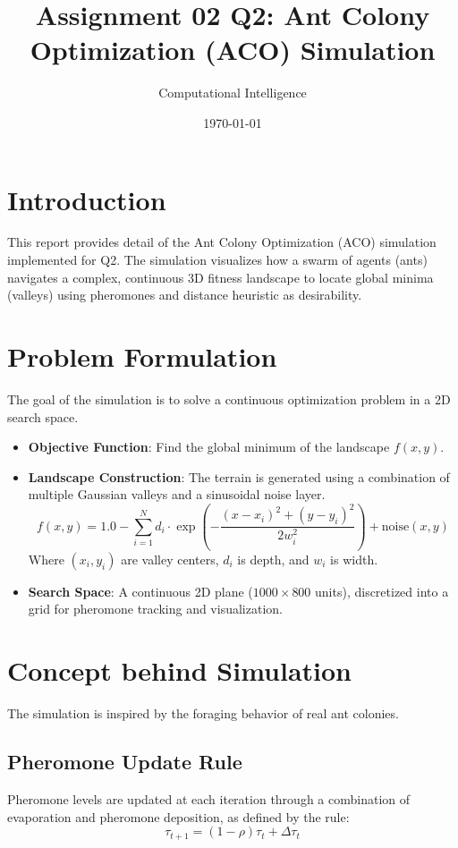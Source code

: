 \documentclass[12pt]{article}
\title{Assignment 02 Q2: Ant Colony Optimization (ACO) Simulation}
\author{Computational Intelligence}
\date{\today}
\begin{document}
\maketitle

\section{Introduction}
This report provides detail of the Ant Colony Optimization (ACO) simulation implemented for Q2. The simulation visualizes how a swarm of agents (ants) navigates a complex, continuous 3D fitness landscape to locate global minima (valleys) using pheromones and distance heuristic as desirability.

\section{Problem Formulation}
The goal of the simulation is to solve a continuous optimization problem in a 2D search space.

\begin{itemize}
    \item \textbf{Objective Function}: Find the global minimum of the landscape $f(x, y)$.
    \item \textbf{Landscape Construction}: The terrain is generated using a combination of multiple Gaussian valleys and a sinusoidal noise layer.
    \begin{equation}
        f(x, y) = 1.0 - \sum_{i=1}^{N} d_i \cdot \exp\left(-\frac{(x-x_i)^2 + (y-y_i)^2}{2w_i^2}\right) + \text{noise}(x, y)
    \end{equation}
    Where $(x_i, y_i)$ are valley centers, $d_i$ is depth, and $w_i$ is width.
    \item \textbf{Search Space}: A continuous 2D plane ($1000 \times 800$ units), discretized into a grid for pheromone tracking and visualization.
\end{itemize}

\section{Concept behind Simulation}
The simulation is inspired by the foraging behavior of real ant colonies.

\subsection{Pheromone Update Rule}
Pheromone levels are updated at each iteration through a combination of evaporation and pheromone deposition, as defined by the rule:
\begin{equation}
    \tau_{t+1} = (1 - \rho)\tau_t + \Delta \tau_t
\end{equation}
\end{document}
